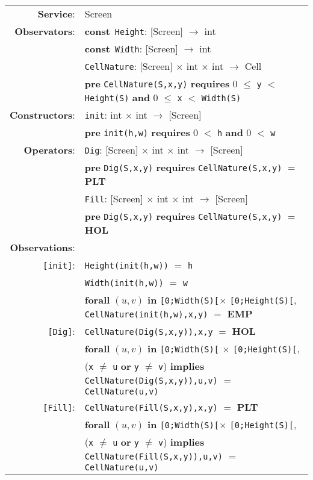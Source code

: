 \documentclass{article}
\begin{document}
\begin{tabular}{rl}
\textbf{Service}: & \textrm{Screen}  \\
\textbf{Observators}: & \textbf{const}~\texttt{Height}: \textrm{[Screen]} $\rightarrow$ \textrm{int} \\
& \textbf{const}~\texttt{Width}: \textrm{[Screen]} $\rightarrow$ \textrm{int} \\
& \texttt{CellNature}: \textrm{[Screen]} $\times$ \textrm{int} $\times$ \textrm{int} $\rightarrow$ \textrm{Cell} \\
& \quad \textbf{pre } \texttt{CellNature(S,x,y)} \textbf{ requires } 0 $\leq$ \texttt{y} $<$ \texttt{Height(S)} \textbf{ and } 0 $\leq$ \texttt{x} $<$ \texttt{Width(S)}\\
\textbf{Constructors}: & \texttt{init}: \textrm{int} $\times$ \textrm{int} $\rightarrow$ \textrm{[Screen]} \\
& \quad \textbf{pre } \texttt{init(h,w)} \textbf{ requires } 0 $<$ \texttt{h} \textbf{ and } 0 $<$ \texttt{w} \\
\textbf{Operators}: & \texttt{Dig}: \textrm{[Screen]} $\times$ \textrm{int} $\times$ \textrm{int}  $\rightarrow$ \textrm{[Screen]} \\
& \quad \textbf{pre } \texttt{Dig(S,x,y)} \textbf{ requires } \texttt{CellNature(S,x,y)} $=$ \textbf{PLT} \\
& \texttt{Fill}: \textrm{[Screen]} $\times$ \textrm{int} $\times$ \textrm{int}  $\rightarrow$ \textrm{[Screen]} \\
& \quad \textbf{pre } \texttt{Dig(S,x,y)} \textbf{ requires } \texttt{CellNature(S,x,y)} $=$ \textbf{HOL} \\
       \textbf{Observations}: & \\
       \texttt{[init]}: & \texttt{Height(init(h,w))} $=$ \texttt{h} \\
       & \texttt{Width(init(h,w))} $=$ \texttt{w} \\
       & \textbf{forall} $(u,v)$ \textbf{in} \texttt{[0;Width(S)[}$\times$ \texttt{[0;Height(S)[},~ \texttt{CellNature(init(h,w),x,y)} $=$ \textbf{EMP} \\
       \texttt{[Dig]}: & \texttt{CellNature(Dig(S,x,y)),x,y} $=$ \textbf{HOL} \\
        & \textbf{forall} $(u,v)$ \textbf{in} \texttt{[0;Width(S)[} $\times$ \texttt{[0;Height(S)[}, \\ & \quad\quad\quad\quad (\texttt{x} $\neq$ \texttt{u} \textbf{or} \texttt{y} $\neq$ \texttt{v}) \textbf{implies} \texttt{CellNature(Dig(S,x,y)),u,v)} $=$ \texttt{CellNature(u,v)} \\
       \texttt{[Fill]}: & \texttt{CellNature(Fill(S,x,y),x,y)} $=$ \textbf{PLT} \\
       & \textbf{forall} $(u,v)$ \textbf{in} \texttt{[0;Width(S)[}$\times$ \texttt{[0;Height(S)[}, \\ & \quad\quad\quad\quad (\texttt{x} $\neq$ \texttt{u} \textbf{or} \texttt{y} $\neq$ \texttt{v}) \textbf{implies} \texttt{CellNature(Fill(S,x,y)),u,v)} $=$ \texttt{CellNature(u,v)} \\
\end{tabular}
\end{document}
